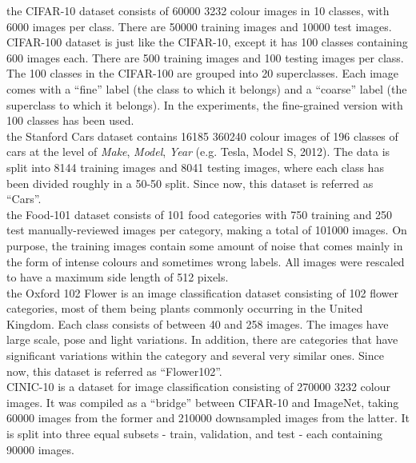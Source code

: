 \documentclass[review]{elsarticle}
\begin{document}
 the CIFAR-10 dataset consists of 60000 3232 colour images in 10 classes, with 6000 images per class. There are 50000 training images and 10000 test images. CIFAR-100 dataset is just like the CIFAR-10, except it has 100 classes containing 600 images each. There are 500 training images and 100 testing images per class. The 100 classes in the CIFAR-100 are grouped into 20 superclasses. Each image comes with a ``fine'' label (the class to which it belongs) and a ``coarse'' label (the superclass to which it belongs). In the experiments, the fine-grained version with 100 classes has been used.\\

 the Stanford Cars dataset contains 16185 360240 colour images of 196 classes of cars at the level of \emph{Make}, \emph{Model}, \emph{Year} (e.g. Tesla, Model S, 2012). The data is split into 8144 training images and 8041 testing images, where each class has been divided roughly in a 50-50 split. Since now, this dataset is referred as ``Cars''.\\

 the Food-101 dataset consists of 101 food categories with 750 training and 250 test manually-reviewed images per category, making a total of 101000 images. On purpose, the training images contain some amount of noise that comes mainly in the form of intense colours and sometimes wrong labels. All images were rescaled to have a maximum side length of 512 pixels. \\

 the Oxford 102 Flower is an image classification dataset consisting of 102 flower categories, most of them being plants commonly occurring in the United Kingdom. Each class consists of between 40 and 258 images. The images have large scale, pose and light variations. In addition, there are categories that have significant variations within the category and several very similar ones. Since now, this dataset is referred as ``Flower102''.\\

CINIC-10 is a dataset for image classification consisting of 270000  3232 colour images. It was compiled as a ``bridge'' between CIFAR-10 and ImageNet, taking 60000 images from the former and 210000 downsampled images from the latter. It is split into three equal subsets - train, validation, and test - each containing 90000 images.\\
\end{document}
